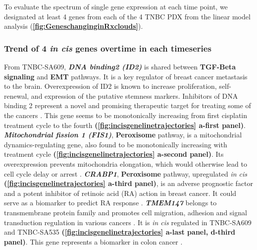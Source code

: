 













To evaluate the spectrum of single gene expression at each time point, we designated at least 4 genes from each of the 4 TNBC PDX from the linear model analysis (\textbf{\autoref{fig:GeneschanginginRxclouds}}).



 
 \subsubsection{Trend of 4 \textit{in cis} genes overtime in each timeseries}
 From TNBC-SA609, \textit{\textbf{DNA binding2 (ID2)}} is shared between \textbf{TGF-Beta signaling} and \textbf{EMT} pathways. It is a key regulator of breast cancer metastasis to the brain. Overexpression of ID2 is known to increase proliferation, self-renewal, and expression of the putative stemness markers.  Inhibitors of DNA binding 2 represent a novel and promising therapeutic target for treating some of the cancers \cite{bae2017inhibitor, kijewska2019using}. This gene seems to be monotonically increasing from first cisplatin treatment cycle to the fourth \textbf{(\autoref{fig:incisgenelinetrajectories} a-first panel)}. \textit{\textbf{Mitochondrial fission 1 (FIS1)}}, \textbf{Peroxisome} pathway, is a mitochondrial dynamics-regulating gene, also found to be monotonically increasing with treatment cycle \textbf{(\autoref{fig:incisgenelinetrajectories} a-second panel)}. Its overexpression prevents mitochondria elongation, which would otherwise lead to cell cycle delay or arrest \cite{fan2015mir, anderson2018dysregulation}. \textit{\textbf{CRABP1}}, \textbf{Peroxisome} pathway, upregulated \textit{in cis} \textbf{(\autoref{fig:incisgenelinetrajectories} a-third panel)}, is an adverse prognostic factor and a potent inhibitor of retinoic acid (RA) action in breast cancer. It could serve as a biomarker to predict RA response \cite{liu2015crabp1}. \textit{\textbf{TMEM147}} belongs to transmembrane protein family and promotes cell migration, adhesion and signal transduction regulation in various cancers \cite{yu2011knockdown}. It is \textit{in cis} regulated in TNBC-SA609 and TNBC-SA535 \textbf{(\autoref{fig:incisgenelinetrajectories} a-last panel, d-third panel)}. This gene represents a biomarker in colon cancer \cite{feng2019identification}. 
 
